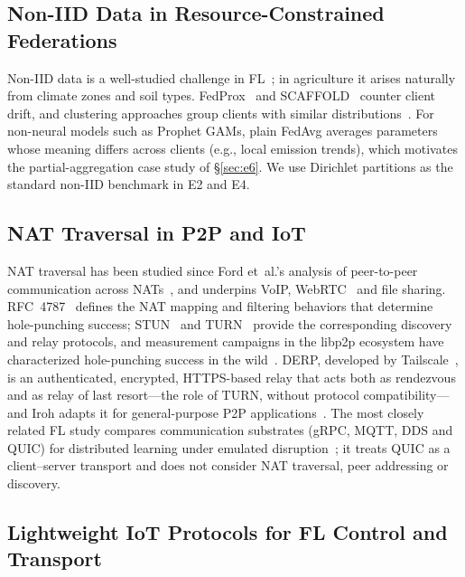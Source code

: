 \documentclass[a4paper,fleqn]{cas-dc}
\begin{document}
\subsection{Non-IID Data in Resource-Constrained Federations}

Non-IID data is a well-studied challenge in FL~\cite{zhao2018noniid,li2022noniid,kairouz2021}; in agriculture it arises naturally from climate zones and soil types. FedProx~\cite{fedprox2020} and SCAFFOLD~\cite{scaffold2020} counter client drift, and clustering approaches group clients with similar distributions~\cite{briggs2020cluster}. For non-neural models such as Prophet GAMs, plain FedAvg averages parameters whose meaning differs across clients (e.g., local emission trends), which motivates the partial-aggregation case study of \S\ref{sec:e6}. We use Dirichlet partitions as the standard non-IID benchmark in E2 and E4.

\subsection{NAT Traversal in P2P and IoT}

NAT traversal has been studied since Ford et~al.'s analysis of peer-to-peer communication across NATs~\cite{ford2005,rfc5128}, and underpins VoIP, WebRTC~\cite{webrtc2021} and file sharing. RFC~4787~\cite{rfc4787} defines the NAT mapping and filtering behaviors that determine hole-punching success; STUN~\cite{rfc8489} and TURN~\cite{rfc8656} provide the corresponding discovery and relay protocols, and measurement campaigns in the libp2p ecosystem have characterized hole-punching success in the wild~\cite{seemann2022}. DERP, developed by Tailscale~\cite{tailscale2023}, is an authenticated, encrypted, HTTPS-based relay that acts both as rendezvous and as relay of last resort---the role of TURN, without protocol compatibility---and Iroh adapts it for general-purpose P2P applications~\cite{iroh2024}. The most closely related FL study compares communication substrates (gRPC, MQTT, DDS and QUIC) for distributed learning under emulated disruption~\cite{kutlu2026}; it treats QUIC as a client--server transport and does not consider NAT traversal, peer addressing or discovery.

\subsection{Lightweight IoT Protocols for FL Control and Transport}
\end{document}
